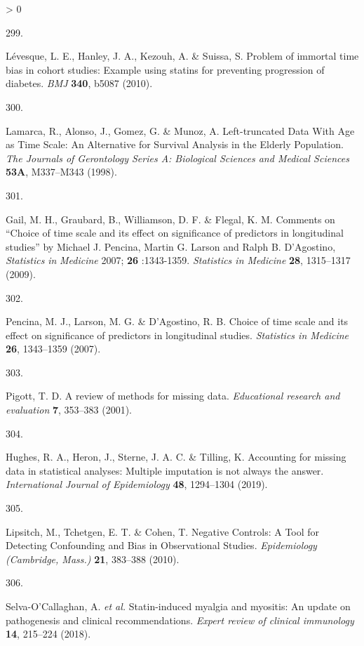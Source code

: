 \documentclass[a4paper, twoside]{templates/ociamthesis}
\newlength{\cslhangindent}
\newlength{\csllabelwidth}
\newenvironment{CSLReferences}[3] %
 {%
  \setlength{\parindent}{0pt}
  \ifodd #1 \everypar{\setlength{\hangindent}{\cslhangindent}}\ignorespaces\fi
  \ifnum #2 > 0
  \setlength{\parskip}{#2\baselineskip}
  \fi
 }%
 {}
\newcommand{\CSLLeftMargin}[1]{\parbox[t]{\maxof{\widthof{#1}}{\csllabelwidth}}{#1}}
\newcommand{\CSLRightInline}[1]{\parbox[t]{\linewidth - \csllabelwidth}{#1}}
\begin{document}
\begin{CSLReferences}{0}{0}
\leavevmode\hypertarget{ref-levesque2010}{}%
\CSLLeftMargin{299. }
\CSLRightInline{Lévesque, L. E., Hanley, J. A., Kezouh, A. \& Suissa, S. Problem of immortal time bias in cohort studies: Example using statins for preventing progression of diabetes. \emph{BMJ} \textbf{340}, b5087 (2010).}

\leavevmode\hypertarget{ref-lamarca1998}{}%
\CSLLeftMargin{300. }
\CSLRightInline{Lamarca, R., Alonso, J., Gomez, G. \& Munoz, A. Left-truncated {Data With Age} as {Time Scale}: An {Alternative} for {Survival Analysis} in the {Elderly Population}. \emph{The Journals of Gerontology Series A: Biological Sciences and Medical Sciences} \textbf{53A}, M337--M343 (1998).}

\leavevmode\hypertarget{ref-gail2009}{}%
\CSLLeftMargin{301. }
\CSLRightInline{Gail, M. H., Graubard, B., Williamson, D. F. \& Flegal, K. M. Comments on {``{Choice} of time scale and its effect on significance of predictors in longitudinal studies''} by {Michael J}. {Pencina}, {Martin G}. {Larson} and {Ralph B}. {D}'{Agostino}, {\emph{Statistics}}{ \emph{in} }{\emph{Medicine}} 2007; {\textbf{26}} :1343-1359. \emph{Statistics in Medicine} \textbf{28}, 1315--1317 (2009).}

\leavevmode\hypertarget{ref-pencina2007}{}%
\CSLLeftMargin{302. }
\CSLRightInline{Pencina, M. J., Larson, M. G. \& D'Agostino, R. B. Choice of time scale and its effect on significance of predictors in longitudinal studies. \emph{Statistics in Medicine} \textbf{26}, 1343--1359 (2007).}

\leavevmode\hypertarget{ref-pigott2001}{}%
\CSLLeftMargin{303. }
\CSLRightInline{Pigott, T. D. A review of methods for missing data. \emph{Educational research and evaluation} \textbf{7}, 353--383 (2001).}

\leavevmode\hypertarget{ref-hughes2019}{}%
\CSLLeftMargin{304. }
\CSLRightInline{Hughes, R. A., Heron, J., Sterne, J. A. C. \& Tilling, K. Accounting for missing data in statistical analyses: Multiple imputation is not always the answer. \emph{International Journal of Epidemiology} \textbf{48}, 1294--1304 (2019).}

\leavevmode\hypertarget{ref-lipsitch2010}{}%
\CSLLeftMargin{305. }
\CSLRightInline{Lipsitch, M., Tchetgen, E. T. \& Cohen, T. Negative {Controls}: A {Tool} for {Detecting Confounding} and {Bias} in {Observational Studies}. \emph{Epidemiology (Cambridge, Mass.)} \textbf{21}, 383--388 (2010).}

\leavevmode\hypertarget{ref-selva-ocallaghan2018}{}%
\CSLLeftMargin{306. }
\CSLRightInline{Selva-O'Callaghan, A. \emph{et al.} Statin-induced myalgia and myositis: An update on pathogenesis and clinical recommendations. \emph{Expert review of clinical immunology} \textbf{14}, 215--224 (2018).}


\end{CSLReferences}
\end{document}
